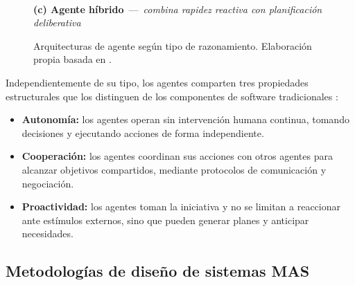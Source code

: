\begin{figure}[H]
\bigskip
\\[5pt]
{\small\textbf{(c) Agente h\'{i}brido} \,---\, \textit{combina rapidez reactiva con planificaci\'{o}n deliberativa}}

\caption{Arquitecturas de agente según tipo de razonamiento. Elaboración propia basada en \citet{perez2022breve}.}
\label{fig:tipos_agentes}
\end{figure}

Independientemente de su tipo, los agentes comparten tres propiedades estructurales que los distinguen de los componentes de software tradicionales  \citep{sakurada2021multi}:
\begin{itemize}
    \item \textbf{Autonomía:} los agentes operan sin intervención humana continua, tomando decisiones y ejecutando acciones de forma independiente.
    \item \textbf{Cooperación:} los agentes coordinan sus acciones con otros agentes para alcanzar objetivos compartidos, mediante protocolos de comunicación y negociación.
    \item \textbf{Proactividad:} los agentes toman la iniciativa y no se limitan a reaccionar ante estímulos externos, sino que pueden generar planes y anticipar necesidades.
\end{itemize}

\subsection{Metodologías de diseño de sistemas MAS}

